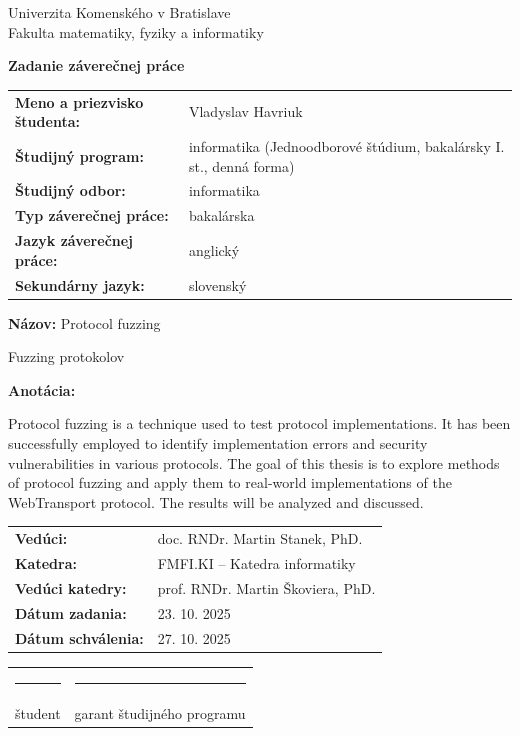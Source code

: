 \begin{center}
\sc\large
Univerzita Komenského v Bratislave\\
Fakulta matematiky, fyziky a informatiky
\end{center}

\vspace{1cm}

\begin{center}
{\Large\bf Zadanie záverečnej práce}
\end{center}

\vspace{0.5cm}

\noindent
\begin{tabular}{@{}p{4.5cm}p{10cm}}
\textbf{Meno a priezvisko študenta:} & Vladyslav Havriuk \\[0.3cm]
\textbf{Študijný program:} & informatika (Jednoodborové štúdium, bakalársky I. st., denná forma) \\[0.3cm]
\textbf{Študijný odbor:} & informatika \\[0.3cm]
\textbf{Typ záverečnej práce:} & bakalárska \\[0.3cm]
\textbf{Jazyk záverečnej práce:} & anglický \\[0.3cm]
\textbf{Sekundárny jazyk:} & slovenský \\[0.3cm]
\end{tabular}

\vspace{0.5cm}

\noindent
\textbf{Názov:} Protocol fuzzing

\noindent
Fuzzing protokolov

\vspace{0.5cm}

\noindent
\textbf{Anotácia:}

\noindent
Protocol fuzzing is a technique used to test protocol implementations. It has been successfully employed to identify implementation errors and security vulnerabilities in various protocols. The goal of this thesis is to explore methods of protocol fuzzing and apply them to real-world implementations of the WebTransport protocol. The results will be analyzed and discussed.

\vspace{1cm}

\noindent
\begin{tabular}{@{}p{4.5cm}p{10cm}}
\textbf{Vedúci:} & doc. RNDr. Martin Stanek, PhD. \\[0.3cm]
\textbf{Katedra:} & FMFI.KI -- Katedra informatiky \\[0.3cm]
\textbf{Vedúci katedry:} & prof. RNDr. Martin Škoviera, PhD. \\[0.3cm]
\textbf{Dátum zadania:} & 23. 10. 2025 \\[0.3cm]
\textbf{Dátum schválenia:} & 27. 10. 2025 \\[0.3cm]
\end{tabular}

\vspace{1.5cm}

\noindent
\begin{tabular}{@{}p{7cm}p{7cm}}
\centering\rule{5cm}{0.4pt} & \centering\rule{5cm}{0.4pt}\tabularnewline
\centering študent & \centering garant študijného programu
\end{tabular}

